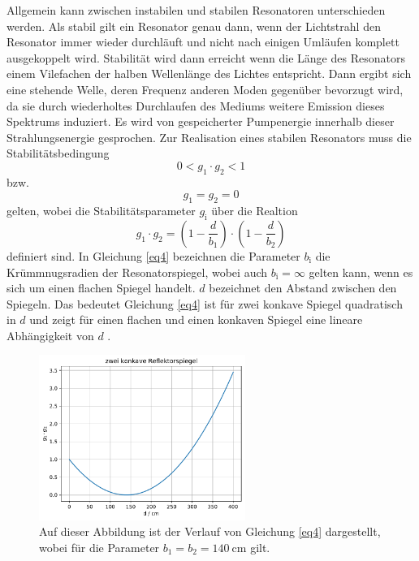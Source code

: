 Allgemein kann zwischen instabilen und stabilen Resonatoren unterschieden werden.
Als stabil gilt ein Resonator genau dann, wenn der Lichtstrahl den Resonator immer
wieder durchläuft und nicht nach einigen Umläufen komplett ausgekoppelt wird.
Stabilität wird dann erreicht wenn die Länge des Resonators einem Vilefachen der 
halben Wellenlänge des Lichtes entspricht. Dann ergibt sich eine stehende Welle,
deren Frequenz anderen Moden gegenüber bevorzugt wird, da sie durch wiederholtes 
Durchlaufen des Mediums weitere Emission dieses Spektrums induziert.
Es wird von gespeicherter Pumpenergie innerhalb dieser Strahlungsenergie gesprochen.
Zur Realisation eines stabilen Resonators muss die Stabilitätsbedingung 
\begin{equation}
    0 < g_1 \cdot g_2 <1  
    \label{eq3}
\end{equation}
bzw.
\begin{equation}
    g_1 = g_2 = 0
    \label{eq3b}
\end{equation}
gelten, wobei die Stabilitätsparameter $g_{\text{i}}$ über die Realtion 
\begin{equation}
    g_1 \cdot g_2  = \left( 1- \frac{d}{b_1} \right) \cdot \left(1 - \frac{d}{b_2} \right)
    \label{eq4}
\end{equation}
definiert sind. In Gleichung \eqref{eq4} bezeichnen die Parameter $b_{\text{i}}$ die 
Krümmnugsradien der Resonatorspiegel, wobei auch $b_{\text{i}} = \infty$ gelten kann, 
wenn es sich um einen flachen Spiegel handelt.
$d$ bezeichnet den Abstand zwischen den Spiegeln. 
Das bedeutet Gleichung \eqref{eq4} ist für zwei konkave Spiegel quadratisch in $d$ und 
zeigt für einen flachen und einen konkaven Spiegel eine lineare Abhängigkeit von $d$ \cite{1}.
\begin{figure}
    \centering
    \includegraphics[width=0.6\textwidth]{figure/d_quad.pdf}
    \caption{Auf dieser Abbildung ist der Verlauf von Gleichung \eqref{eq4} 
    dargestellt, wobei für die Parameter $b_{1}=b_{2} = \SI{140}{\centi\meter}$ gilt.}
    \label{abb1}
\end{figure}
